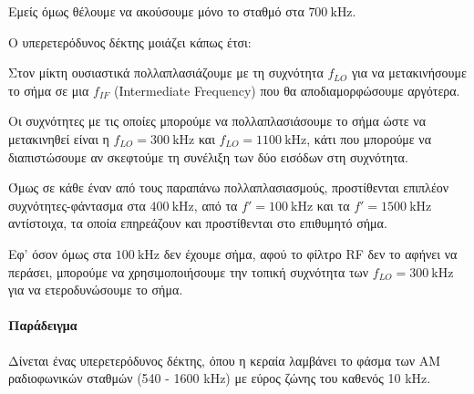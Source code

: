 \documentclass[11pt,a4paper,notitlepage,fleqn]{article}
\begin{document}
Εμείς όμως θέλουμε να ακούσουμε μόνο το σταθμό στα \( \SI{700}{\kilo\hertz} \).

Ο υπερετερόδυνος δέκτης μοιάζει κάπως έτσι:


Στον μίκτη ουσιαστικά πολλαπλασιάζουμε με τη συχνότητα \( f_{LO} \) για να μετακινήσουμε
το σήμα σε μια \( f_{IF} \) (Intermediate Frequency) που θα αποδιαμορφώσουμε αργότερα.

Οι συχνότητες με τις οποίες μπορούμε να πολλαπλασιάσουμε το σήμα ώστε να μετακινηθεί είναι
η \( f_{LO} = \SI{300}{\kilo\hertz} \) και \( f_{LO} = \SI{1100}{\kilo\hertz} \), κάτι
που μπορούμε να διαπιστώσουμε αν σκεφτούμε τη συνέλιξη των δύο εισόδων στη συχνότητα.

Όμως σε κάθε έναν από τους παραπάνω πολλαπλασιασμούς, προστίθενται επιπλέον συχνότητες-φάντασμα στα \( \SI{400}{\kilo\hertz} \), από τα \( f' = \SI{100}{\kilo\hertz} \)
και τα \( f' = \SI{1500}{\kilo\hertz} \) αντίστοιχα, τα οποία επηρεάζουν και προστίθενται
στο επιθυμητό σήμα.

Εφ' όσον όμως στα \( \SI{100}{\kilo\hertz} \) δεν έχουμε σήμα, αφού το φίλτρο RF δεν
το αφήνει να περάσει, μπορούμε να χρησιμοποιήσουμε την τοπική συχνότητα των
\( f_{LO} = \SI{300}{\kilo\hertz} \) για να ετεροδυνώσουμε το σήμα.


\paragraph{Παράδειγμα}

Δίνεται ένας υπερετερόδυνος δέκτης, όπου η κεραία λαμβάνει το φάσμα των AM ραδιοφωνικών σταθμών
(540 - 1600 kHz) με εύρος ζώνης του καθενός 10 kHz.
\end{document}
